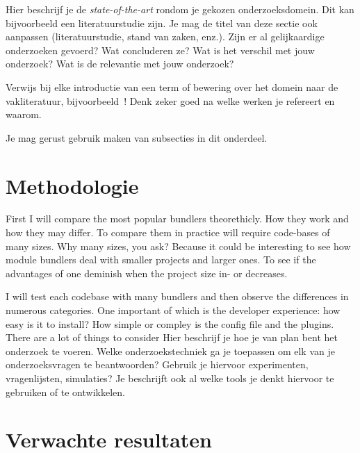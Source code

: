 Hier beschrijf je de \emph{state-of-the-art} rondom je gekozen onderzoeksdomein. Dit kan bijvoorbeeld een literatuurstudie zijn. Je mag de titel van deze sectie ook aanpassen (literatuurstudie, stand van zaken, enz.). Zijn er al gelijkaardige onderzoeken gevoerd? Wat concluderen ze? Wat is het verschil met jouw onderzoek? Wat is de relevantie met jouw onderzoek?

Verwijs bij elke introductie van een term of bewering over het domein naar de vakliteratuur, bijvoorbeeld~\autocite{Doll1954}! Denk zeker goed na welke werken je refereert en waarom.


Je mag gerust gebruik maken van subsecties in dit onderdeel.

\section{Methodologie}
\label{sec:methodologie}

First I will compare the most popular bundlers theorethicly. How they work and how they may differ.
To compare them in practice will require code-bases of many sizes. Why many sizes, you ask? Because it could be interesting to see how module bundlers deal with smaller projects and larger ones. To see if the advantages of one deminish when the project size in- or decreases. 

I will test each codebase with many bundlers and then observe the differences in numerous categories. One important of which is the developer experience: how easy is it to install? How simple or compley is the config file and the plugins. There are a lot of things to consider  
Hier beschrijf je hoe je van plan bent het onderzoek te voeren. Welke onderzoekstechniek ga je toepassen om elk van je onderzoeksvragen te beantwoorden? Gebruik je hiervoor experimenten, vragenlijsten, simulaties? Je beschrijft ook al welke tools je denkt hiervoor te gebruiken of te ontwikkelen.

\section{Verwachte resultaten}
\label{sec:verwachte_resultaten}

